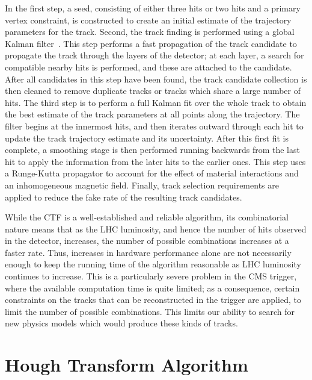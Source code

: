\documentclass[preprint,sort&compress]{elsarticle}
\begin{document}
In the first step, a seed, consisting of either three hits or two hits and a primary vertex constraint, is
constructed to create an initial estimate of the trajectory parameters for the track. Second, the track
finding is performed using a global Kalman filter~\cite{bib:Fruhwirth:1987fm}. This step performs a fast
propagation of the track candidate to propagate the track through the layers of the detector; at each layer, a
search for compatible nearby hits is performed, and these are attached to the candidate. After all candidates
in this step have been found, the track candidate collection is then cleaned to remove duplicate tracks or
tracks which share a large number of hits. The third step is to perform a full Kalman fit over the whole
track to obtain the best estimate of the track parameters at all points along the trajectory. The filter
begins at the innermost hits, and then iterates outward through each hit to update the track trajectory
estimate and its uncertainty. After this first fit is complete, a smoothing stage is then performed running
backwards from the last hit to apply the information from the later hits to the earlier ones. This step uses a
Runge-Kutta propagator to account for the effect of material interactions and an inhomogeneous magnetic
field. Finally, track selection requirements are applied to reduce the fake rate of the resulting track
candidates.

While the CTF is a well-established and reliable algorithm, its combinatorial nature means that as the LHC
luminosity, and hence the number of hits observed in the detector, increases, the number of possible
combinations increases at a faster rate. Thus, increases in hardware performance alone are not necessarily
enough to keep the running time of the algorithm reasonable as LHC luminosity continues to increase. This is a
particularly severe problem in the CMS trigger, where the available computation time is quite limited; as a
consequence, certain constraints on the tracks that can be reconstructed in the trigger are applied, to limit
the number of possible combinations. This limits our ability to search for new physics models which would
produce these kinds of tracks.

\section{Hough Transform Algorithm}
\end{document}
